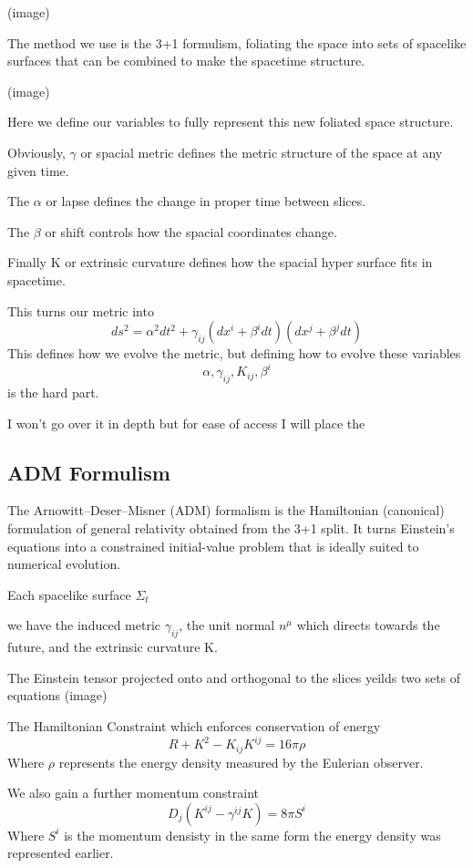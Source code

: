 (image)

The method we use is the 3+1 formulism, foliating the space into sets of spacelike surfaces that can be combined to make the spacetime structure.

(image)

Here we define our variables to fully represent this new foliated space structure.

Obviously, $\gamma$ or spacial metric defines the metric structure of the space at any given time.

The $\alpha$ or lapse defines the change in proper time between slices.

The $\beta$ or shift controls how the spacial coordinates change.

Finally K or extrinsic curvature defines how the spacial hyper surface fits in spacetime.

This turns our metric into
\[
	ds^2 = \alpha^2 dt^2 + \gamma_{ij}(dx^i+\beta^i dt)(dx^j + \beta^j dt)
\]
This defines how we evolve the metric, but defining how to evolve these variables
\[
	\alpha, \gamma_{ij}, K_{ij}, \beta^i
\]
is the hard part.


I won't go over it in depth but for ease of access I will place the
\subsection{ADM Formulism}

The Arnowitt–Deser–Misner (ADM) formalism is the Hamiltonian (canonical) formulation of general relativity obtained from the 3+1 split. It turns Einstein’s equations into a constrained initial-value problem that is ideally suited to numerical evolution.

Each spacelike surface $\Sigma_t$

we have the induced metric $\gamma_{ij}$, the unit normal $n^\mu$ which directs towards the future, and the extrinsic curvature K.

The Einstein tensor projected onto and orthogonal to the slices yeilds two sets of equations
(image)

The Hamiltonian Constraint which enforces conservation of energy
\[
	R + K^2 - K_{ij}K^{ij} = 16 \pi \rho
\]
Where $\rho$ represents the energy density measured by the Eulerian observer.

We also gain a further momentum constraint
\[
	D_j(K^{ij} - \gamma^{ij}K) = 8 \pi S^i
\]
Where $S^i$ is the momentum densisty in the same form the energy density was represented earlier.

